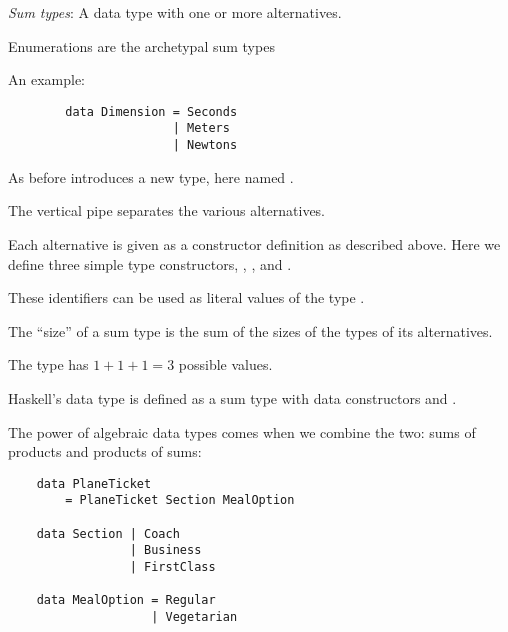 \begin{notelist}
\begin{notelist}
    \item \textit{Sum types}: A data type with one or more alternatives.
    \begin{notelist}
        \item Enumerations are the archetypal sum types
        \item An example:
        \begin{lstlisting}
        data Dimension = Seconds
                       | Meters
                       | Newtons
        \end{lstlisting}
        \begin{notelist}
            \item As before  introduces a new type, here named .
            \item The vertical pipe \code{|} separates the various alternatives.
            \item Each alternative is given as a constructor definition as described above.
                  Here we define three simple type constructors, , , and
                  .
            \item These identifiers can be used as literal values of the type . 
        \end{notelist}
        \item The ``size'' of a sum type is the sum of the sizes of the types of its alternatives.
        \item The type  has $1 + 1 + 1 = 3$ possible values.
        \item Haskell's  data type is defined as a sum type with data constructors  and .
    \end{notelist}

    \item The power of algebraic data types comes when we combine the two: sums of products and products of sums:
    \begin{lstlisting}
    data PlaneTicket
        = PlaneTicket Section MealOption

    data Section | Coach
                 | Business
                 | FirstClass

    data MealOption = Regular
                    | Vegetarian


\end{lstlisting}
\end{notelist}
\end{notelist}
